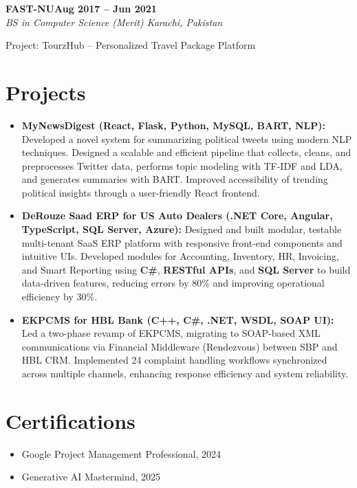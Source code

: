 \documentclass[letterpaper,10pt]{article}
\newcommand{\headingBf}[2]{
  \hspace{10pt}\textbf{#1}\hfill\textbf{#2}\\
}
\newcommand{\headingIt}[2]{
  \hspace{10pt}\textit{#1}\hfill\textit{#2}\\
}
\newenvironment{resume_list}{
  \vspace{-7pt}
  \begin{itemize}[itemsep=-2px, parsep=1pt, leftmargin=30pt]
}{
  \end{itemize}
}
\begin{document}
\headingBf{FAST-NU}{Aug 2017 -- Jun 2021}
\headingIt{BS in Computer Science (Merit) \hfill Karachi, Pakistan}{}
\begin{resume_list}
    \item Project: TourzHub -- Personalized Travel Package Platform
\end{resume_list}

\section{Projects}
\begin{itemize}
    \setlength\itemsep{3pt}
    \item \textbf{MyNewsDigest (React, Flask, Python, MySQL, BART, NLP):} Developed a novel system for summarizing political tweets using modern NLP techniques. Designed a scalable and efficient pipeline that collects, cleans, and preprocesses Twitter data, performs topic modeling with TF-IDF and LDA, and generates summaries with BART. Improved accessibility of trending political insights through a user-friendly React frontend.
    \item \textbf{DeRouze Saad ERP for US Auto Dealers (.NET Core, Angular, TypeScript, SQL Server, Azure): } Designed and built modular, testable multi-tenant SaaS ERP platform with responsive front-end components and intuitive UIs. Developed modules for Accounting, Inventory, HR, Invoicing, and Smart Reporting using \textbf{C\#}, \textbf{RESTful APIs}, and \textbf{SQL Server} to build data-driven features, reducing errors by 80\% and improving operational efficiency by 30\%.
    \item \textbf{EKPCMS for HBL Bank (C++, C\#, .NET, WSDL, SOAP UI):} Led a two-phase revamp of EKPCMS, migrating to SOAP-based XML communications via Financial Middleware (Rendezvous) between SBP and HBL CRM. Implemented 24 complaint handling workflows synchronized across multiple channels, enhancing response efficiency and system reliability.
\end{itemize}

\section{Certifications}
\begin{itemize}
    \item Google Project Management Professional, 2024
    \item Generative AI Mastermind, 2025
\end{itemize}

\vspace*{\fill}
\end{document}
